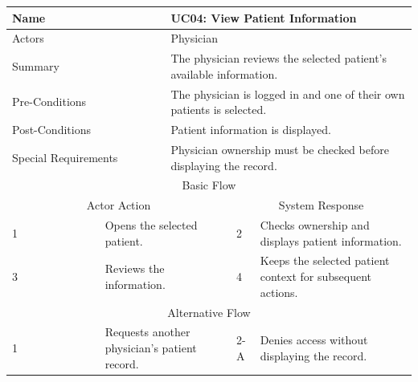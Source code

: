 \begin{reporttable}
\centering
\small
\caption{UC04: View Patient Information.}
\label{tab:kashaf:uc04}
\begin{tabular}{|p{}|p{}|p{}|p{}|p{}|}
\hline
\multicolumn{2}{|p{\dimexpr0.225\textwidth+2\tabcolsep+\arrayrulewidth\relax}|}{Name} & \multicolumn{3}{p{\dimexpr0.575\textwidth+4\tabcolsep+2\arrayrulewidth\relax}|}{UC04: View Patient Information} \\ \hline
\multicolumn{2}{|p{\dimexpr0.225\textwidth+2\tabcolsep+\arrayrulewidth\relax}|}{Actors} & \multicolumn{3}{p{\dimexpr0.575\textwidth+4\tabcolsep+2\arrayrulewidth\relax}|}{Physician} \\ \hline
\multicolumn{2}{|p{\dimexpr0.225\textwidth+2\tabcolsep+\arrayrulewidth\relax}|}{Summary} & \multicolumn{3}{p{\dimexpr0.575\textwidth+4\tabcolsep+2\arrayrulewidth\relax}|}{The physician reviews the selected patient's available information.} \\ \hline
\multicolumn{2}{|p{\dimexpr0.225\textwidth+2\tabcolsep+\arrayrulewidth\relax}|}{Pre-Conditions} & \multicolumn{3}{p{\dimexpr0.575\textwidth+4\tabcolsep+2\arrayrulewidth\relax}|}{The physician is logged in and one of their own patients is selected.} \\ \hline
\multicolumn{2}{|p{\dimexpr0.225\textwidth+2\tabcolsep+\arrayrulewidth\relax}|}{Post-Conditions} & \multicolumn{3}{p{\dimexpr0.575\textwidth+4\tabcolsep+2\arrayrulewidth\relax}|}{Patient information is displayed.} \\ \hline
\multicolumn{2}{|p{\dimexpr0.225\textwidth+2\tabcolsep+\arrayrulewidth\relax}|}{Special Requirements} & \multicolumn{3}{p{\dimexpr0.575\textwidth+4\tabcolsep+2\arrayrulewidth\relax}|}{Physician ownership must be checked before displaying the record.} \\ \hline
\multicolumn{5}{|c|}{Basic Flow} \\ \hline
\multicolumn{3}{|c|}{Actor Action} & \multicolumn{2}{c|}{System Response} \\ \hline
1 & \multicolumn{2}{p{\dimexpr0.37\textwidth+2\tabcolsep+\arrayrulewidth\relax}|}{Opens the selected patient.} & 2 & Checks ownership and displays patient information. \\ \hline
3 & \multicolumn{2}{p{\dimexpr0.37\textwidth+2\tabcolsep+\arrayrulewidth\relax}|}{Reviews the information.} & 4 & Keeps the selected patient context for subsequent actions. \\ \hline
\multicolumn{5}{|c|}{Alternative Flow} \\ \hline
1 & \multicolumn{2}{p{\dimexpr0.37\textwidth+2\tabcolsep+\arrayrulewidth\relax}|}{Requests another physician's patient record.} & 2-A & Denies access without displaying the record. \\ \hline
\end{tabular}
\end{reporttable}

